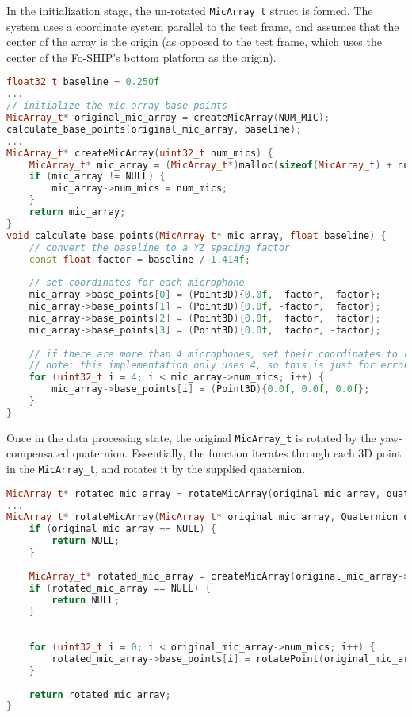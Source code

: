 \documentclass[12pt,a4paper]{report}
\begin{document}
In the initialization stage, the un-rotated \verb|MicArray_t| struct is formed. The system uses a coordinate system parallel to the test frame, and assumes that the center of the array is the origin (as opposed to the test frame, which uses the center of the Fo-SHIP's bottom platform as the origin).

\begin{lstlisting}[language=C++]
float32_t baseline = 0.250f
...
// initialize the mic array base points
MicArray_t* original_mic_array = createMicArray(NUM_MIC);
calculate_base_points(original_mic_array, baseline);
...
MicArray_t* createMicArray(uint32_t num_mics) {
	MicArray_t* mic_array = (MicArray_t*)malloc(sizeof(MicArray_t) + num_mics * sizeof(Point3D));
	if (mic_array != NULL) {
		mic_array->num_mics = num_mics;
	}
	return mic_array;
}
void calculate_base_points(MicArray_t* mic_array, float baseline) {
	// convert the baseline to a YZ spacing factor
	const float factor = baseline / 1.414f;
	
	// set coordinates for each microphone
	mic_array->base_points[0] = (Point3D){0.0f, -factor, -factor};
	mic_array->base_points[1] = (Point3D){0.0f, -factor,  factor};
	mic_array->base_points[2] = (Point3D){0.0f,  factor,  factor};
	mic_array->base_points[3] = (Point3D){0.0f,  factor, -factor};
	
	// if there are more than 4 microphones, set their coordinates to (0,0,0)
	// note: this implementation only uses 4, so this is just for error catching
	for (uint32_t i = 4; i < mic_array->num_mics; i++) {
		mic_array->base_points[i] = (Point3D){0.0f, 0.0f, 0.0f};
	}
}
\end{lstlisting}

Once in the data processing state, the original \verb|MicArray_t| is rotated by the yaw-compensated quaternion. Essentially, the function iterates through each 3D point in the \verb|MicArray_t|, and rotates it by the supplied quaternion.

\begin{lstlisting}[language=C++]
MicArray_t* rotated_mic_array = rotateMicArray(original_mic_array, quat);
...
MicArray_t* rotateMicArray(MicArray_t* original_mic_array, Quaternion quat) {
	if (original_mic_array == NULL) {
		return NULL;
	}
	
	MicArray_t* rotated_mic_array = createMicArray(original_mic_array->num_mics);
	if (rotated_mic_array == NULL) {
		return NULL;
	}
	
	
	for (uint32_t i = 0; i < original_mic_array->num_mics; i++) {
		rotated_mic_array->base_points[i] = rotatePoint(original_mic_array->base_points[i], quat);
	}
	
	return rotated_mic_array;
}
\end{lstlisting}
\end{document}
